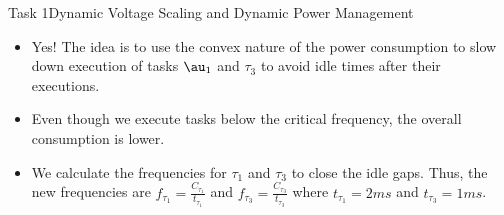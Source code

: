 \begin{frame}{Task 1}{Dynamic Voltage Scaling and Dynamic Power Management}
    \begin{solutionnoinc}
        \begin{itemize}
            \item Yes! The idea is to use the convex nature of the power consumption to slow down execution of tasks $\au_1$ and $\tau_3$ to avoid idle times after their executions.
            \item Even though we execute tasks below the critical frequency, the overall consumption is lower.
            \item We calculate the frequencies for $\tau_1$ and $\tau_3$ to close the idle gaps. Thus, the new frequencies are $f_{\tau_1} = \frac{C_{\tau_1}}{t_{\tau_1}}$ and $f_{\tau_3} = \frac{C_{\tau_3}}{t_{\tau_3}}$ where $t_{\tau_1} = 2ms$ and $t_{\tau_3} = 1ms$.
        \end{itemize}
    \end{solutionnoinc}
\end{frame}

